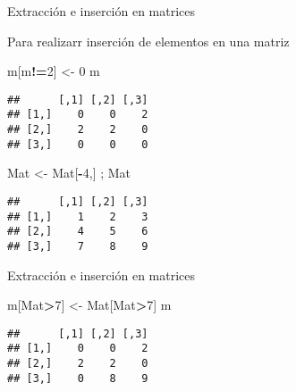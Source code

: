 \documentclass[ignorenonframetext,]{beamer}
\newenvironment{Shaded}{\begin{snugshade}}{\end{snugshade}}
\newcommand{\DecValTok}[1]{\textcolor[rgb]{0.00,0.00,0.81}{#1}}
\newcommand{\StringTok}[1]{\textcolor[rgb]{0.31,0.60,0.02}{#1}}
\newcommand{\OperatorTok}[1]{\textcolor[rgb]{0.81,0.36,0.00}{\textbf{#1}}}
\newcommand{\NormalTok}[1]{#1}
\begin{document}
\begin{frame}[fragile]{Extracción e inserción en matrices}

Para realizarr inserción de elementos en una matriz

\begin{Shaded}
\begin{Highlighting}[]
\NormalTok{m[m}\OperatorTok{!=}\DecValTok{2}\NormalTok{] <-}\StringTok{ }\DecValTok{0}
\NormalTok{m}
\end{Highlighting}
\end{Shaded}
\pause
\begin{verbatim}
##      [,1] [,2] [,3]
## [1,]    0    0    2
## [2,]    2    2    0
## [3,]    0    0    0
\end{verbatim}

\begin{Shaded}
\begin{Highlighting}[]
\NormalTok{Mat <-}\StringTok{ }\NormalTok{Mat[}\OperatorTok{-}\DecValTok{4}\NormalTok{,] ; Mat}
\end{Highlighting}
\end{Shaded}
\pause
\begin{verbatim}
##      [,1] [,2] [,3]
## [1,]    1    2    3
## [2,]    4    5    6
## [3,]    7    8    9
\end{verbatim}

\end{frame}

\begin{frame}[fragile]{Extracción e inserción en matrices}

\begin{Shaded}
\begin{Highlighting}[]
\NormalTok{m[Mat}\OperatorTok{>}\DecValTok{7}\NormalTok{] <-}\StringTok{ }\NormalTok{Mat[Mat}\OperatorTok{>}\DecValTok{7}\NormalTok{]}
\NormalTok{m}
\end{Highlighting}
\end{Shaded}
\pause
\begin{verbatim}
##      [,1] [,2] [,3]
## [1,]    0    0    2
## [2,]    2    2    0
## [3,]    0    8    9
\end{verbatim}

\end{frame}
\end{document}
